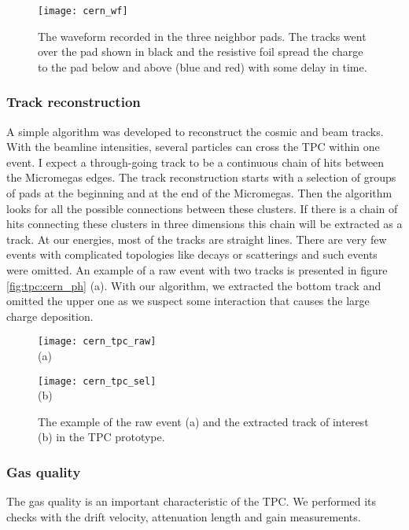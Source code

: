 \documentclass[../main.tex]{subfiles}
\begin{document}
\begin{figure}[!ht]
   \centering
   \texttt{[image: cern\_wf]}
   \caption{The waveform recorded in the three neighbor pads. The tracks went over the pad shown in black and the resistive foil spread the charge to the pad below and above (blue and red) with some delay in time.}
   \label{fig:tpc:cern_wf}
 \end{figure}

\subsubsection{Track reconstruction}
A simple algorithm was developed to reconstruct the cosmic and beam tracks. With the beamline intensities, several particles can cross the TPC within one event. I expect a through-going track to be a continuous chain of hits between the Micromegas edges. The track reconstruction starts with a selection of groups of pads at the beginning and at the end of the Micromegas. Then the algorithm looks for all the possible connections between these clusters. If there is a chain of hits connecting these clusters in three dimensions this chain will be extracted as a track. At our energies, most of the tracks are straight lines. There are very few events with complicated topologies like decays or scatterings and such events were omitted. An example of a raw event with two tracks is presented in figure \autoref{fig:tpc:cern_ph} (a). With our algorithm, we extracted the bottom track and omitted the upper one as we suspect some interaction that causes the large charge deposition.

\begin{figure}[!ht]
  \centering
  \begin{minipage}{0.49\linewidth}
    \centering
    \texttt{[image: cern\_tpc\_raw]} \\ (a)
  \end{minipage}
  \begin{minipage}{0.49\linewidth}
    \centering
    \texttt{[image: cern\_tpc\_sel]} \\ (b)
  \end{minipage}
  \caption{The example of the raw event (a) and the extracted track of interest (b) in the TPC prototype.}
  \label{fig:tpc:cern_ph}
\end{figure}

\subsubsection{Gas quality}
The gas quality is an important characteristic of the TPC. We performed its checks with the drift velocity, attenuation length and gain measurements.
\end{document}
